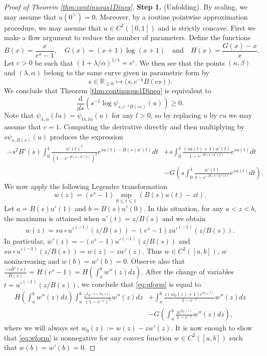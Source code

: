 \documentclass[a4paper,reqno,12pt]{amsart}
\renewcommand{\r}{\mathbb{R}}
\newcommand{\la}{\lambda}
\newcommand{\al}{\alpha}
\newcommand{\be}{\beta}
\newcommand{\ka}{\kappa}
\newcommand{\1}{\bo{1}}
\renewcommand{\d}{\mathrm{d}}
\begin{document}
\begin{proof}[Proof of Theorem \ref{thm:continuous1Dineq}] {\bf Step 1. }(Unfolding).
By scaling, we may assume that $u(0^+)=0$. Moreover, by a routine pointwise approximation procedure, we may assume that $u\in C^2([0,1])$ and is strictly concave. First we make a flow argument to reduce the number of parameters. Define the functions
$$
B(x) = \frac{x}{e^x-1}, \quad G(x) = (x+1)\log(x+1) \quad \text{and} \quad H(x)=\frac{G(x)-x}{x}.
$$
Let $c>0$ be such that $(1+\la/\al)^{1/\la}= e^c$. We then see that the points $(\ka,\be)$ and $(\la,\al)$ belong to the same curve given in parametric form by
$$
s\in \r_{\ge0} \mapsto \big( s, c^{-1}B(cs)\big).
$$
We conclude that Theorem \ref{thm:continuous1Dineq} is equivalent to
	$$
	\frac{\d}{ds}\left( {s^{-1}\log \psi_{s,c^{-1}B(cs)}(u)} \right)  \geq 0.
	$$
Note that $\psi_{\la,\al}(lu)=\psi_{l\la,l\al}(u)$ for any $l>0$, so by replacing $u$ by $cu$ we may assume that $c=1$. Computing the derivative directly and then multiplying by $s \psi_{s,B(s)}(u)$ produces the expression
\begin{align}\label{eq:uform}
{-s^2B'(s)} \int_0^1 \frac{u'(t)^2}{(1-e^{-B(s)u'(t)})^2}{e^{s u(t)-B(s)u'(t)}}dt  & + s\int_0^1 \frac{(su(t)+1)u'(t)}{1-e^{-B(s)u'(t)}}e^{s u(t)}dt \\
& - G\left(s\int_0^1 \frac{u'(t)}{1-e^{-B(s)u'(t)}}e^{s u(t)}dt\right).
\end{align}
We now apply the following Legendre transformation
	\[w(z) =(e^s-1)\sup_{0\leq t\leq 1} ( B(s) u(t)- z t).\]
Let $a=B(s)u'(1)$ and $b=B(s)u'(0)$.  In this situation, for any $a<z<b$, the maximum is attained when $u'(t)=z/B(s)$ and  we obtain
\begin{align}\label{eq:legendreids}
w(z)=s u \circ u'^{(-1)}(z/B(s)) - (e^s-1) z u'^{(-1)}(z/B(s)).
\end{align}
In particular, $w'(z)=-(e^s-1) u'^{(-1)}(z/B(s))$ and $s u \circ u'^{(-1)}(z/B(s)) = w(z)-zw'(z)$.
Thus $w\in C^2([a,b])$, $w$ nonincreasing and $w(b)=w'(b)=0$. Observe also that $\frac{-sB'(s)}{B(s)} = H(e^s-1)=H\left(\int_a^bw''(z) dz\right)$. After the change of variables $t = u'^{(-1)}(z/B(s))$, we conclude that  \eqref{eq:uform} is equal to
\begin{align}\label{eq:wform}
H\left( \int_a^b w''(z)dz \right) \int_a^b \frac{z^2e^{-z+w_0(z)}}{(1-e^{-z})^2}w''(z)dz  & +  \int_a^b \frac{z(w_0(z)+1)e^{w_0(z)}}{1-e^{-z}}w''(z)dz \\
& - G\left( \int_a^b \frac{ze^{w_0(z)}}{1-e^{-z}}w''(z)dz\right),
\end{align}
where we will always set $w_0(z):=w(z)-zw'(z)$. It is now enough to show that \eqref{eq:wform} is nonnegative for any convex function $w \in C^2([a,b])$ such that $w(b)=w'(b)=0$.



\end{proof}
\end{document}
